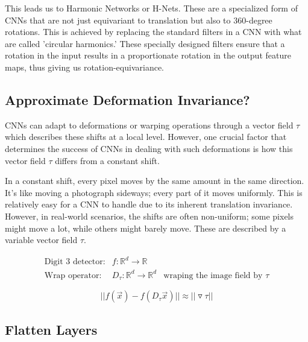 \documentclass[11pt]{article}
\begin{document}
This leads us to Harmonic Networks or H-Nets. These are a specialized form of CNNs that are not just equivariant to translation but also to 360-degree rotations. This is achieved by replacing the standard filters in a CNN with what are called 'circular harmonics.' These specially designed filters ensure that a rotation in the input results in a proportionate rotation in the output feature maps, thus giving us rotation-equivariance.

\subsection{Approximate Deformation Invariance?}

CNNs can adapt to deformations or warping operations through a vector field $\tau$ which describes these shifts at a local level. However, one crucial factor that determines the success of CNNs in dealing with such deformations is how this vector field $\tau$ differs from a constant shift.

In a constant shift, every pixel moves by the same amount in the same direction. It's like moving a photograph sideways; every part of it moves uniformly. This is relatively easy for a CNN to handle due to its inherent translation invariance. However, in real-world scenarios, the shifts are often non-uniform; some pixels might move a lot, while others might barely move. These are described by a variable vector field $\tau$.

\begin{align*}
    \text{Digit 3 detector:} & f:\mathbb{R}^d \rightarrow \mathbb{R} \\
    \text{Wrap operator:} & D_\tau:\mathbb{R}^d \rightarrow \mathbb{R}^d & \text{wraping the image field by } \tau
\end{align*}

\begin{equation*}
    ||f(\vec{x})-f(D_\tau\vec{x})|| \approx || \triangledown \tau ||
\end{equation*}



\subsection{Flatten Layers}
\end{document}
